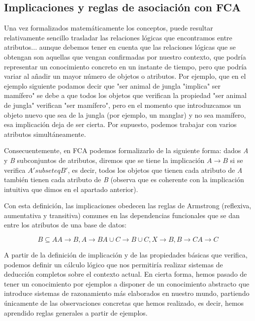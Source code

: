 \documentclass[12pt]{article}
\begin{document}
	\subsection{Implicaciones y reglas de asociaci\'{o}n con FCA}
	
		Una vez formalizados matem\'{a}ticamente los conceptos, puede resultar relativamente sencillo trasladar 
		las relaciones l\'{o}gicas que encontramos entre atributos... aunque debemos tener en cuenta que las 
		relaciones l\'{o}gicas que se obtengan son aquellas que vengan confirmadas por nuestro contexto, 
		que podr\'{i}a representar un conocimiento concreto en un instante de tiempo, pero que podr\'{i}a 
		variar al añadir un mayor n\'{u}mero de objetos o atributos. Por ejemplo, que en el ejemplo 
		siguiente podamos decir que "ser animal de jungla "implica" ser mam\'{i}fero" se debe a que todos 
		los objetos que verifican la propiedad "ser animal de jungla" verifican "ser mam\'{i}fero", pero 
		en el momento que introduzcamos un objeto nuevo que sea de la jungla (por ejemplo, un manglar) y 
		no sea mam\'{i}fero, esa implicaci\'{o}n deja de ser cierta. Por supuesto, podemos trabajar con
		 varios atributos simult\'{a}neamente.
		
		Consecuentemente, en FCA podemos formalizarlo de la siguiente forma: dados \textit{A} y \textit{B}
		subconjuntos de atributos, diremos que se tiene la implicaci\'{o}n $A \to B$ si se verifica 
		$A′ subseteq B′$, es decir, todos los objetos que tienen cada atributo de \textit{A} tambi\'{e}n 
		tienen cada atributo de \textit{B} (observa que es coherente con la implicaci\'{o}n intuitiva que 
		dimos en el apartado anterior).
	
	Con esta definición, las implicaciones obedecen las reglas de Armstrong (reflexiva, aumentativa y transitiva) comunes en las dependencias funcionales que se dan entre los atributos de una base de datos:
	
	\[
		B \subseteq A A \to B, A \to B A \cup C \to B \cup C, X \to B, B \to C A\to C
	\]
		
	A partir de la definición de implicación y de las propiedades básicas que verifica, podemos definir un cálculo lógico que nos permitiría realizar sistemas de deducción completos sobre el contexto actual. En cierta forma, hemos pasado de tener un conocimiento por ejemplos a disponer de un conocimiento abstracto que introduce sistemas de razonamiento más elaborados en nuestro mundo, partiendo únicamente de las observaciones concretas que hemos realizado, es decir, hemos aprendido reglas generales a partir de ejemplos.
 
\end{document}
